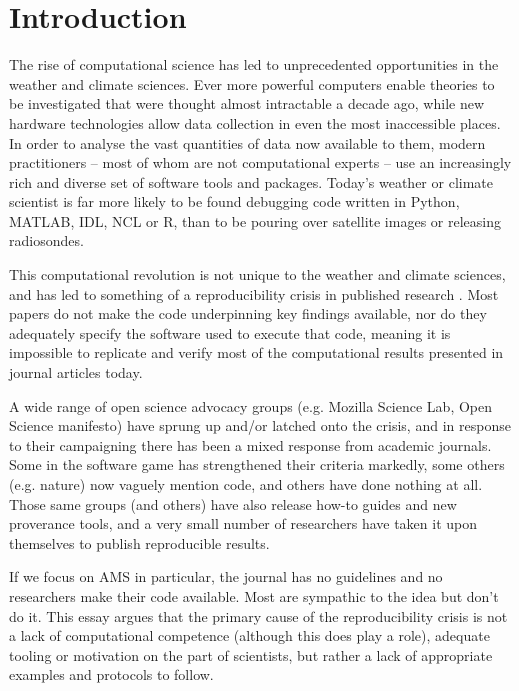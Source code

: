 \section{Introduction}
The rise of computational science has led to unprecedented opportunities in the weather and climate sciences. Ever more powerful computers enable theories to be investigated that were thought almost intractable a decade ago, while new hardware technologies allow data collection in even the most inaccessible places. In order to analyse the vast quantities of data now available to them, modern practitioners – most of whom are not computational experts – use an increasingly rich and diverse set of software tools and packages. Today's weather or climate scientist is far more likely to be found debugging code written in Python, MATLAB, IDL, NCL or R, than to be pouring over satellite images or releasing radiosondes. 

This computational revolution is not unique to the weather and climate sciences, and has led to something of a reproducibility crisis in published research \citep[e.g.][]{Peng2011}. Most papers do not make the code underpinning key findings available, nor do they adequately specify the software used to execute that code, meaning it is impossible to replicate and verify most of the computational results presented in journal articles today.

A wide range of open science advocacy groups (e.g. Mozilla Science Lab, Open Science manifesto) have sprung up and/or latched onto the crisis, and in response to their campaigning there has been a mixed response from academic journals. Some in the software game has strengthened their criteria markedly, some others (e.g. nature) now vaguely mention code, and others have done nothing at all. Those same groups (and others) have also release how-to guides and new proverance tools, and a very small number of researchers have taken it upon themselves to publish reproducible results. 

If we focus on AMS in particular, the journal has no guidelines and no researchers make their code available. Most are sympathic to the idea but don't do it. This essay argues that the primary cause of the reproducibility crisis is not a lack of computational competence (although this does play a role), adequate tooling or motivation on the part of scientists, but rather a lack of appropriate examples and protocols to follow.
